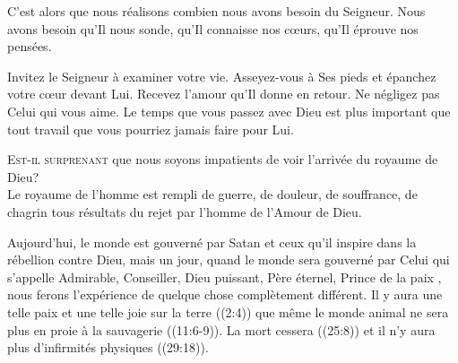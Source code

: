 C'est alors que nous réalisons combien nous avons besoin du Seigneur.
 Nous avons besoin qu'Il nous sonde, qu'Il connaisse nos c\oe{}urs,
 qu'Il éprouve nos pensées.

Invitez le Seigneur à examiner votre vie. Asseyez-vous à Ses pieds
 et épanchez votre c\oe{}ur devant Lui.
 Recevez l'amour qu'Il donne en retour. Ne négligez pas Celui qui vous aime.
 Le temps que vous passez avec Dieu est plus important
 que tout travail que vous pourriez jamais faire pour Lui.

\dvrule







\lettrine{E}{st-il surprenant} que nous soyons impatients
 de voir l'arrivée du royaume de Dieu? \\[1ex]
Le royaume de l'homme est rempli de guerre, de douleur, de souffrance,
 de chagrin \ocadr tous résultats du rejet par l'homme de l'Amour de Dieu. 


Aujourd'hui, le monde est gouverné par Satan et ceux qu'il inspire
 dans la rébellion contre Dieu, mais un jour, quand le monde sera gouverné
 par Celui qui s'appelle \og Admirable, Conseiller, Dieu puissant,
 Père éternel, Prince de la paix \fg{}, 
 nous ferons l'expérience de quelque chose complètement différent.
 Il y aura une telle paix et une telle joie sur la terre ((2:4))
 que même le monde animal ne sera plus en proie à la sauvagerie
 ((11:6-9)).
 La mort cessera ((25:8))
 et il n'y aura plus d'infirmités physiques ((29:18)). 

